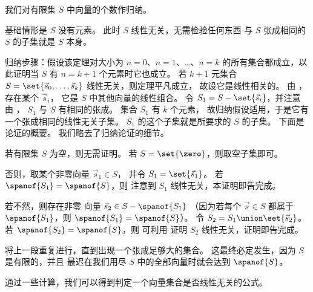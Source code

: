     \begin{answer}
      \begin{exparts}
         \partsitem 我们对有限集
           \( S \) 中向量的个数作归纳。

           基础情形是 $S$ 没有元素。
           此时 $S$ 线性无关，无需检验任何东西\Dash
           与 $S$ 张成相同的 $S$ 的子集就是 $S$
           本身。

           归纳步骤：假设该定理对大小为 $n=0$、$n=1$、\ldots、$n=k$
           的所有集合都成立，以此证明当 \( S \) 有 $n=k+1$ 个元素时它也成立。
           若 $k+1$ 元集合 \( S=\set{\vec{s}_0,\dots,\vec{s}_{k}} \)
           线性无关，则定理平凡成立，
           故设它是线性相关的。
           由 ，存在某个 \( \vec{s}_i \)，
           它是 \( S \) 中其他向量的线性组合。
           令 \( S_1=S-\set{\vec{s}_i} \)，并注意
           由 ，
           \( S_1 \) 与 \( S \) 有相同的张成。
           集合 \( S_1 \) 有 \( k \) 个元素，
           故归纳假设适用，于是它有一个张成相同的线性无关子集。
           \( S_1 \) 的这个子集就是所要求的 \( S \) 的子集。
         \partsitem 下面是论证的概要。
           我们略去了归纳论证的细节。

           若有限集 \( S \) 为空，则无需证明。
           若 \( S=\set{\zero} \)，则取空子集即可。

           否则，取某个非零向量 \( \vec{s}_1\in S \)，
           并令 \( S_1=\set{\vec{s}_1} \)。
           若 \( \spanof{S_1}=\spanof{S} \)，则
           注意到 \( S_1 \) 线性无关，本证明即告完成。

           若不然，则存在非零
           向量 \( \vec{s}_2\in S-\spanof{S_1} \)
           （因为若每个 \( \vec{s}\in S \) 都属于 \( \spanof{S_1} \)，则
           \( \spanof{S_1}=\spanof{S} \)）。
           令 \( S_2=S_1\union\set{\vec{s}_2} \)。
           若 \( \spanof{S_2}=\spanof{S} \)，则
           可利用 
           证明 \( S_2 \) 线性无关，证明即告完成。

           将上一段重复进行，直到出现一个张成足够大的集合。
           这最终必定发生，因为 \( S \) 是有限的，并且
           最迟在我们用尽
           \( S \) 中的全部向量时就会达到 \( \spanof{S} \)。
      \end{exparts}
    \end{answer}
  \item
     通过一些计算，我们可以得到判定一个向量集合是否线性无关的公式。
